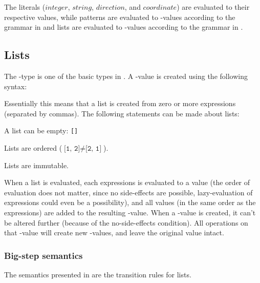 The literals ($integer$, $string$, $direction$, and $coordinate$) are evaluated to their
respective values, while patterns are evaluated to -values according to
the grammar in  and lists are evaluated to -values
according to the grammar in .

\subsection{Lists}
\label{sec:lists}

The -type is one of the basic types in \productname{}. A -value is
created using the following syntax:

\begin{ebnf}
\end{ebnf}

Essentially this means that a list is created from zero or more expressions (separated
by commas). The following statements can be made about lists:

\begin{nlist}
\item A list can be empty: \texttt{[]}
\item Lists are ordered ($\texttt{[1, 2]} \ne \texttt{[2, 1]}$).
\item Lists are immutable.
\end{nlist}

When a list is evaluated, each expressions is evaluated to a value (the order
of evaluation does not matter, since no side-effects are possible, lazy-evaluation of expressions
could even be a possibility), and all values (in the same order as the expressions) are
added to the resulting -value. When a -value is created, it can't be
altered further (because of the no-side-effects condition). All operations on that -value
will create new -values, and leave the original value intact.

\subsubsection{Big-step semantics}

The semantics presented in  are the transition rules
for lists.

